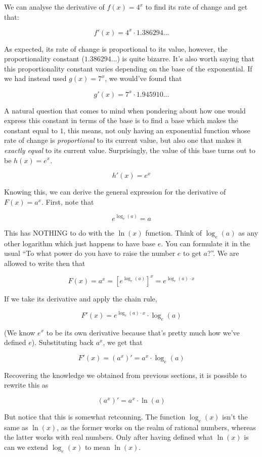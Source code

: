 We can analyse the derivative of $f(x) = 4^x$ to find its rate of change and get that:

$$f'(x) = 4^x \cdot 1.386294...$$

As expected, its rate of change is proportional to its value, however, the proportionality constant ($1.386294...$) is quite bizarre. It's also worth saying that this proportionality constant varies depending on the base of the exponential. If we had instead used $g(x) = 7^x$, we would've found that

$$g'(x) = 7^x \cdot 1.945910...$$

\newpage

A natural question that comes to mind when pondering about how one would express this constant in terms of the base is to find a base which makes the constant equal to $1$, this means, not only having an exponential function whose rate of change is \textit{proportional} to its current value, but also one that makes it \textit{exactly equal} to its current value. Surprisingly, the value of this base turns out to be $h(x) = e^x$.

$$h'(x) = e^x$$

Knowing this, we can derive the general expression for the derivative of $F(x) = a^x$. First, note that

$$e^{\log_e(a)} = a$$

This has NOTHING to do with the $\ln(x)$ function. Think of $\log_e(a)$ as any other logarithm which just happens to have base $e$. You can formulate it in the usual \enquote{To what power do you have to raise the number $e$ to get $a$?}. We are allowed to write then that

$$F(x) = a^x = [e^{\log_e(a)}]^x = e^{\log_e(a)\cdot x}$$

If we take its derivative and apply the chain rule,

$$F'(x) = e^{\log_e(a)\cdot x} \cdot \log_e(a)$$

(We know $e^x$ to be its own derivative because that's pretty much how we've defined $e$). Substituting back $a^x$, we get that

$$F'(x) = (a^x)' = a^x \cdot \log_e(a)$$

Recovering the knowledge we obtained from previous sections, it is possible to rewrite this as

$$(a^x)' = a^x \cdot \ln(a)$$

But notice that this is somewhat retconning. The function $\log_e(x)$ isn't the same as $\ln(x)$, as the former works on the realm of rational numbers, whereas the latter works with real numbers. Only after having defined what $\ln(x)$ is can we extend $\log_e(x)$ to mean $\ln(x)$.

